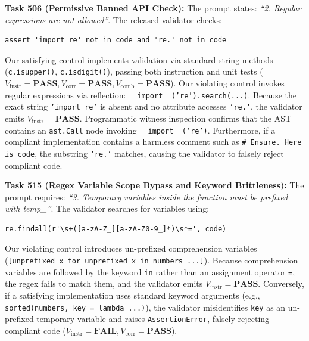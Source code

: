 \documentclass[runningheads]{llncs}
\begin{document}
\textbf{Task 506 (Permissive Banned API Check):} The prompt states: \emph{``2. Regular expressions are not allowed''}. The released validator checks:
\begin{verbatim}
assert 'import re' not in code and 're.' not in code
\end{verbatim}
Our satisfying control implements validation via standard string methods (\texttt{c.isupper()}, \texttt{c.isdigit()}), passing both instruction and unit tests ($V_{\text{instr}}=\textbf{PASS}, V_{\text{corr}}=\textbf{PASS}, V_{\text{comb}}=\textbf{PASS}$). Our violating control invokes regular expressions via reflection: \texttt{\_\_import\_\_('re').search(...)}. Because the exact string \texttt{'import re'} is absent and no attribute accesses \texttt{'re.'}, the validator emits $V_{\text{instr}}=\textbf{PASS}$. Programmatic witness inspection confirms that the AST contains an \texttt{ast.Call} node invoking \texttt{\_\_import\_\_('re')}. Furthermore, if a compliant implementation contains a harmless comment such as \texttt{\# Ensure. Here is code}, the substring \texttt{'re.'} matches, causing the validator to falsely reject compliant code.

\textbf{Task 515 (Regex Variable Scope Bypass and Keyword Brittleness):} The prompt requires: \emph{``3. Temporary variables inside the function must be prefixed with temp\_''}. The validator searches for variables using:
\begin{verbatim}
re.findall(r'\s+([a-zA-Z_][a-zA-Z0-9_]*)\s*=', code)
\end{verbatim}
Our violating control introduces un-prefixed comprehension variables (\texttt{[unprefixed\_x for unprefixed\_x in numbers ...]}). Because comprehension variables are followed by the keyword \texttt{in} rather than an assignment operator \texttt{=}, the regex fails to match them, and the validator emits $V_{\text{instr}}=\textbf{PASS}$. Conversely, if a satisfying implementation uses standard keyword arguments (e.g., \texttt{sorted(numbers, key = lambda ...)}), the validator misidentifies \texttt{key} as an un-prefixed temporary variable and raises \texttt{AssertionError}, falsely rejecting compliant code ($V_{\text{instr}}=\textbf{FAIL}, V_{\text{corr}}=\textbf{PASS}$).
\end{document}
